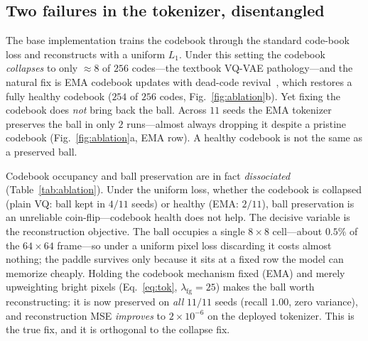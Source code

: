 \documentclass[11pt]{article}
\newcommand{\nseeds}{11}
\newcommand{\keptPlain}{4}
\newcommand{\keptEMA}{2}
\newcommand{\keptFG}{11}
\newcommand{\ballFG}{1.00}           %
\newcommand{\activePlain}{8}         %
\newcommand{\activeEMA}{254}         %
\newcommand{\reconFG}{2\times10^{-6}} %
\begin{document}
\subsection{Two failures in the tokenizer, disentangled}
\label{sec:tok-results}
The base implementation trains the codebook through the standard code-book loss
and reconstructs with a uniform $L_1$. Under this setting the codebook
\emph{collapses} to only $\approx\!\activePlain$ of $256$ codes---the textbook
VQ-VAE pathology---and the natural fix is EMA codebook updates with dead-code
revival~\cite{vqvae2,jukebox}, which restores a fully healthy codebook
($\activeEMA$ of $256$ codes, Fig.~\ref{fig:ablation}b). Yet fixing the codebook
does \emph{not} bring back the ball. Across $\nseeds$ seeds the EMA tokenizer
preserves the ball in only $\keptEMA$ runs---almost always dropping it despite a
pristine codebook (Fig.~\ref{fig:ablation}a, EMA row). A healthy codebook is not
the same as a preserved ball.

Codebook occupancy and ball preservation are in fact \emph{dissociated}
(Table~\ref{tab:ablation}). Under the uniform loss, whether the codebook is
collapsed (plain VQ: ball kept in $\keptPlain/\nseeds$ seeds) or healthy (EMA:
$\keptEMA/\nseeds$), ball preservation is an unreliable coin-flip---codebook
health does not help. The decisive variable is the reconstruction objective. The
ball occupies a single $8{\times}8$ cell---about $0.5\%$ of the $64{\times}64$
frame---so under a uniform pixel loss discarding it costs almost nothing; the
paddle survives only because it sits at a fixed row the model can memorize
cheaply. Holding the codebook mechanism fixed (EMA) and merely upweighting bright
pixels (Eq.~\ref{eq:tok}, $\lambda_{\text{fg}}{=}25$) makes the ball worth
reconstructing: it is now preserved on \emph{all} $\keptFG/\nseeds$ seeds (recall
$\ballFG$, zero variance), and reconstruction MSE \emph{improves} to $\reconFG$
on the deployed tokenizer. This is the true fix, and it is orthogonal to the
collapse fix.
\end{document}

